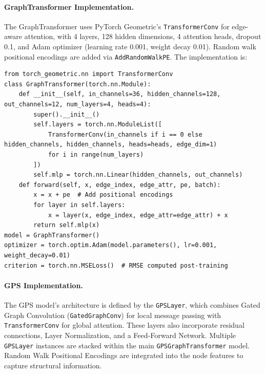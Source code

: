 \documentclass[runningheads]{llncs}
\begin{document}
\paragraph{GraphTransformer Implementation.}
The GraphTransformer uses PyTorch Geometric’s \texttt{TransformerConv} for edge-aware attention, with 4 layers, 128 hidden dimensions, 4 attention heads, dropout 0.1, and Adam optimizer (learning rate 0.001, weight decay 0.01). Random walk positional encodings are added via \texttt{AddRandomWalkPE}. The implementation is:
\begin{lstlisting}[style=customPython]
from torch_geometric.nn import TransformerConv
class GraphTransformer(torch.nn.Module):
    def __init__(self, in_channels=36, hidden_channels=128, out_channels=12, num_layers=4, heads=4):
        super().__init__()
        self.layers = torch.nn.ModuleList([
            TransformerConv(in_channels if i == 0 else hidden_channels, hidden_channels, heads=heads, edge_dim=1)
            for i in range(num_layers)
        ])
        self.mlp = torch.nn.Linear(hidden_channels, out_channels)
    def forward(self, x, edge_index, edge_attr, pe, batch):
        x = x + pe  # Add positional encodings
        for layer in self.layers:
            x = layer(x, edge_index, edge_attr=edge_attr) + x
        return self.mlp(x)
model = GraphTransformer()
optimizer = torch.optim.Adam(model.parameters(), lr=0.001, weight_decay=0.01)
criterion = torch.nn.MSELoss()  # RMSE computed post-training
\end{lstlisting}
\paragraph{GPS Implementation.}
The GPS model's architecture is defined by the \texttt{GPSLayer}, which combines Gated Graph Convolution (\texttt{GatedGraphConv}) for local message passing with \texttt{TransformerConv} for global attention. These layers also incorporate residual connections, Layer Normalization, and a Feed-Forward Network. Multiple \texttt{GPSLayer} instances are stacked within the main \texttt{GPSGraphTransformer} model. Random Walk Positional Encodings are integrated into the node features to capture structural information.
\end{document}
